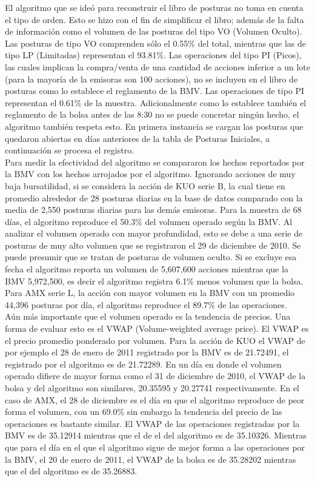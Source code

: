 \documentclass[11pt]{article}
\numberwithin{equation}{section} %
\begin{document}
El algoritmo que se ideó para reconstruir el libro de posturas no toma en cuenta el tipo de orden. Esto se hizo con el fin de simplificar el libro; además de la falta de información como el volumen de las posturas del tipo VO (Volumen Oculto). Las posturas de tipo VO comprenden sólo el 0.55\% del total, mientras que las de tipo LP (Limitadas) representan el 93.81\%. Las operaciones del tipo PI (Picos), las cuales implican la compra/venta de una cantidad de acciones inferior a un lote (para la mayoría de la emisoras son 100 acciones), no se incluyen en el libro de posturas como lo establece el reglamento de la BMV. Las operaciones de tipo PI representan el 0.61\% de la muestra. Adicionalmente como lo establece también el reglamento de la bolsa antes de las 8:30 no se puede concretar ningún hecho, el algoritmo también respeta esto. En primera instancia se cargan las posturas que quedaron abiertas en días anteriores de la tabla de Posturas Iniciales, a continuación se procesa el registro.\\

Para medir la efectividad del algoritmo se compararon los hechos reportados por la BMV con los hechos arrojados por el algoritmo.
Ignorando acciones de muy baja bursatilidad, si se considera la acción de KUO serie B, la cual tiene en promedio alrededor de 28 posturas diarias en la base de datos comparado con la media de 2,550 posturas diarias para las demás emisoras. Para la muestra de 68 días, el algoritmo reproduce el 50.3\% del volumen operado según la BMV. Al analizar el volumen operado con mayor profundidad, esto se debe a una serie de posturas de muy alto volumen que se registraron el 29 de diciembre de 2010. Se puede presumir que se tratan de posturas de volumen oculto. Si se excluye esa fecha el algoritmo reporta un volumen de 5,607,600 acciones mientras que la BMV 5,972,500, es decir el algoritmo registra 6.1\% menos volumen que la bolsa. Para AMX serie L, la acción con mayor volumen en la BMV con un promedio 44,396 posturas por día, el algoritmo reproduce el 89.7\% de las operaciones.\\

Aún más importante que el volumen operado es la tendencia de precios. Una forma de evaluar esto es el VWAP (Volume-weighted average price). El VWAP es el precio promedio ponderado por volumen. Para la acción de KUO el VWAP de por ejemplo el 28 de enero de 2011 registrado por la BMV es de 21.72491, el registrado por el algoritmo es de 21.72289. En un día en donde el volumen operado difiere de mayor forma como el 31 de diciembre de 2010, el VWAP de la bolsa y del algoritmo son similares, 20.35595 y 20.27741 respectivamente. En el caso de AMX, el 28 de diciembre es el día en que el algoritmo reproduce de peor forma el volumen, con un 69.0\% sin embargo la tendencia del precio de las operaciones es bastante similar. El VWAP de las operaciones registradas por la BMV es de 35.12914 mientras que el de el del algoritmo es de 35.10326. Mientras que para el día en el que el algoritmo sigue de mejor forma a las operaciones por la BMV, el 20 de enero de 2011, el VWAP de la bolsa es de 35.28202 mientras que el del algoritmo es de 35.26883.
\end{document}
